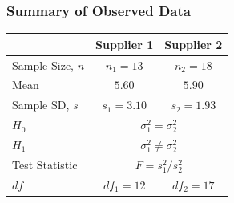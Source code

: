 \documentclass[handout]{beamer}
\begin{document}
\begin{frame}
    \frametitle{Summary of Observed Data}
    \centering
    \renewcommand{\arraystretch}{1.2}
    \begin{tabular}{l c c}
    \toprule
         & Supplier 1 & Supplier 2 \\
    \midrule
         Sample Size, $n$ & $n_1=13$ & $n_2=18$ \\
         Mean & $5.60$ & $5.90$ \\
         Sample SD, $s$ & $s_1=3.10$ & $s_2=1.93$ \\
    \midrule
        $H_0$ & \multicolumn{2}{c}{$\sigma_1^2=\sigma_2^2$} \\
        $H_1$ & \multicolumn{2}{c}{$\sigma_1^2\neq\sigma_2^2$} \\
        Test Statistic & \multicolumn{2}{c}{$F=s_1^2/s_2^2$} \\
        $df$ & $df_1=12$ & $df_2=17$ \\
    \bottomrule
    \end{tabular}
    \renewcommand{\arraystretch}{1.0}
    \vspace*{\fill}
\end{frame}
 
\end{document}
